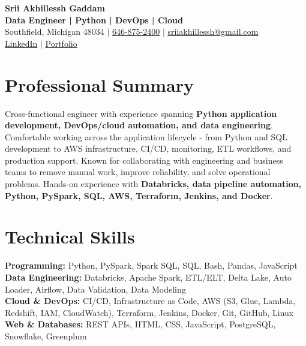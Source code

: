 \documentclass[letterpaper,10pt]{article}
\begin{document}
\fontsize{9.35pt}{10.45pt}\selectfont

\begin{center}
    {\LARGE \textbf{Srii Akhillessh Gaddam}} \\[-1pt]
    \textbf{Data Engineer | Python | DevOps | Cloud} \\[2pt]
    Southfield, Michigan 48034 $|$
    \href{tel:6468752400}{646-875-2400} $|$
    \href{mailto:sriiakhillessh@gmail.com}{sriiakhillessh@gmail.com} \\[1pt]
    \href{https://www.linkedin.com/in/srii-akhiilessh-gaddam-b48668191/}{LinkedIn} $|$
    \href{https://sriiakhillesshg.github.io/portfolio/}{Portfolio}
\end{center}
\vspace{-8pt}

\section{Professional Summary}
\small{Cross-functional engineer with experience spanning \textbf{Python application development, DevOps/cloud automation, and data engineering}. Comfortable working across the application lifecycle - from Python and SQL development to AWS infrastructure, CI/CD, monitoring, ETL workflows, and production support. Known for collaborating with engineering and business teams to remove manual work, improve reliability, and solve operational problems. Hands-on experience with \textbf{Databricks, data pipeline automation, Python, PySpark, SQL, AWS, Terraform, Jenkins, and Docker}.}

\section{Technical Skills}
\small{
\textbf{Programming:} Python, PySpark, Spark SQL, SQL, Bash, Pandas, JavaScript \\
\textbf{Data Engineering:} Databricks, Apache Spark, ETL/ELT, Delta Lake, Auto Loader, Airflow, Data Validation, Data Modeling \\
\textbf{Cloud \& DevOps:} CI/CD, Infrastructure as Code, AWS (S3, Glue, Lambda, Redshift, IAM, CloudWatch), Terraform, Jenkins, Docker, Git, GitHub, Linux \\
\textbf{Web \& Databases:} REST APIs, HTML, CSS, JavaScript, PostgreSQL, Snowflake, Greenplum
}
\end{document}
